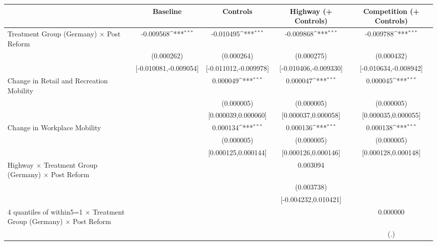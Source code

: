 {
\def\sym#1{\ifmmode^{#1}\else\(^{#1}\)\fi}
\begin{tabular}{l*{4}{c}}
\toprule
                    &\multicolumn{1}{c}{Baseline}&\multicolumn{1}{c}{Controls}&\multicolumn{1}{c}{Highway (+ Controls)}&\multicolumn{1}{c}{Competition (+ Controls)}\\
\midrule
Treatment Group (Germany) $\times$ Post Reform&   -0.009568\sym{***}&   -0.010495\sym{***}&   -0.009868\sym{***}&   -0.009788\sym{***}\\
                    &  (0.000262)         &  (0.000264)         &  (0.000275)         &  (0.000432)         \\
                    &[-0.010081,-0.009054]         &[-0.011012,-0.009978]         &[-0.010406,-0.009330]         &[-0.010634,-0.008942]         \\
Change in Retail and Recreation Mobility&                     &    0.000049\sym{***}&    0.000047\sym{***}&    0.000045\sym{***}\\
                    &                     &  (0.000005)         &  (0.000005)         &  (0.000005)         \\
                    &                     &[0.000039,0.000060]         &[0.000037,0.000058]         &[0.000035,0.000055]         \\
Change in Workplace Mobility&                     &    0.000134\sym{***}&    0.000136\sym{***}&    0.000138\sym{***}\\
                    &                     &  (0.000005)         &  (0.000005)         &  (0.000005)         \\
                    &                     &[0.000125,0.000144]         &[0.000126,0.000146]         &[0.000128,0.000148]         \\
Highway $\times$ Treatment Group (Germany) $\times$ Post Reform&                     &                     &    0.003094         &                     \\
                    &                     &                     &  (0.003738)         &                     \\
                    &                     &                     &[-0.004232,0.010421]         &                     \\
4 quantiles of within5=1 $\times$ Treatment Group (Germany) $\times$ Post Reform&                     &                     &                     &    0.000000         \\
                    &                     &                     &                     &         (.)         \\

\end{tabular}}
